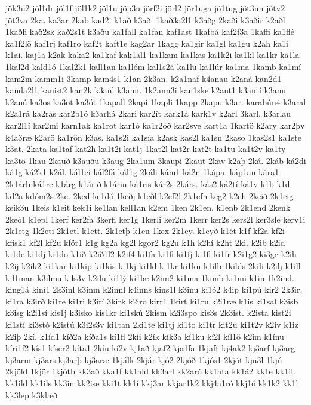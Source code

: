 {jök3u2
jöl1dr
jöl1f
jöl1k2
jöl1u
jöp3u
jörf2i
jörl2
jör1uga
jö1tug
jöt3un
jötv2
jöt3va
2ka.
ka3ar
2kab
kad2i
k1að
k3að.
1kað3a2l1
k3aðg
2kaði
k3aðir
k2aðl
1kaðli
kað2sk
kað2s1t
k3aðu
ka1fall
ka1fan
kaf1ast
1kafbá
kaf2f3a
1kaffi
ka1flé
ka1f2lö
kaf1rj
kaf1ro
kaf2t
kaft1e
kag2ar
1kagg
ka1gir
ka1gl
ka1gu
k2ah
ka1i
k1ai.
kaj1a
k2ak
kaka2
ka1kaf
kak1al1
ka1kam
ka1kas
ka1k2i
ka1kl
ka1kr
ka1la
1kal2d
kald1ó
1kal2k1
kall1an
ka1lóm
kal1s2á
ka1lu
ka1lúr
ka1ma
1kamb
ka1mí
kam2m
kamm1i
3kamp
kam4s1
k1an
2k3an.
k2a1naf
k4anau
k2aná
kan2d1
kanda2l1
kanist2
kan2k
k3anl
k3ann.
1k2ann3i
kan1ske
k2ant1
k3antí
k3anu
k2anú
ka3os
ka3ot
ka3ót
1kapall
2kapi
1kapli
1kapp
2kapu
k3ar.
karabún4
k3aral
k2a1rá
ka2rás
kar2b1ó
k3arhá
2kari
kar2ít
kark1a
kark1v
k2arl
3karl.
k3arlau
kar2l1í
kar2mi
karn1ak
ka1rot
kar1ó
ka1r2óð
kar2sve
kart1a
1kartö
k2ary
kar2þv
k4a3ræ
k2arö
ka1rön
k3as.
ka1s2i
ka1sía
k2ask
kas2l
ka1sn
2kaso
1kas2s1
ka1ste
k3at.
2kata
ka1taf
kat2h
ka1t2i
kat1j
1kat2l
kat2r
kat2t
ka1tu
ka1t2v
ka1ty
ka3tö
1kau
2kauð
k3auðu
k3aug
2ka1um
3kaupi
2kaut
2kav
k2aþ
2ká.
2káb
ká2di
ká1g
ká2k1
k2ál.
kál1ei
kál2fá
kál1g
2káli
kám1
ká2n
1kápa.
káp1an
kára1
2k1árb
ká1re
k1árg
k1árið
k1árin
ká1ris
kár2s
2kárs.
kás2
ká2tí
ká1v
k1b
k1d
kd2a
kdóm2s
2ke.
2ked
ke1dó
1keðj
k1eðl
k2ef2l
2k1efn
keg2
k2eh
2keið
2k1eig
keik3u
1keis
k1eit
kek1i
ke1lan
kell1an
k2em
1ken
2k1en.
k1enb
2k1end
2kenk
2keó1
k1epl
1kerf
ker2fa
3kerfi
ker1g
1kerli
ker2m
1kerr
ker2s
kers2l
ker3sle
kerv1i
2k1etg
1k2eti
2k1etl
k1ett.
2k1etþ
k1eu
1kex
2k1ey.
k1eyð
k1ét
k1f
kf2a
kf2i
kfisk1
kf2l
kf2u
kför1
k1g
kg2a
kg2l
kgor2
kg2u
k1h
k2hí
k2ht
2ki.
k2ib
k2id
ki1de
ki1dj
ki1do
k1ið
k2ið1l2
k2if4
ki1fa
ki1fi
ki1fj
ki1fl
ki1fr
k2i1g2
ki3ge
k2ih
k2ij
k2ik2
ki1kar
ki1kip
ki1kis
ki1kj
ki1kl
ki1kr
ki1ku
k1ilb
1kilds
2kili
k2ilj
k1ill
kil1man
k3ilmu
kils3v
k2ilu
ki1lý
ki1læ
k2im2
ki1ma
1kimb
ki1mi
k1in
1k2ind.
king1á
kiní1
2k3inl
k3inm
k2innl
k4inns
kins1l
k3inu
ki1ó2
k4ip
ki1pú
kir2
2k3ir.
ki1ra
k3irð
ki1re
ki1ri
k3irí
3kirk
k2iro
kirr1
1kirt
ki1ru
k2i1ræ
k1is
ki1sal
k3isb
k3isg
k2i1sí
kis1j
k3isko
kis1kr
ki1skú
2kism
k2i3spo
kis3s
2k3ist.
k2ista
kist2i
ki1stí
ki3stó
k2istú
k3i2s3v
ki1tan
2ki1te
ki1tj
ki1to
ki1tr
kit2u
ki1t2v
k2iv
k1iz
k2iþ
2kí.
k1íd1
kíð2a
kíða1s
kí1fl
2kíi
k2ík
kík3a
kí1ku
kí2l
kíl1ö
k2ím
k1ínu
kíri1f2
kís1
kíser2
kíta1
2kíu
kí2v
kj1að
kjaf2
kja1fa
1kjaft
kj4ak2
kj3arf
kj3arg
kj3arm
kj3ars
kj3arþ
kj3aræ
1kjálk
2kjár
kjó2
2kjóð
1kjós1
2kjót
kju3l
1kjú
2kjöld
1kjör
1kjötb
kk3að
kka1f
kk1ald
kk3arl
kk2aró
kk1ata
kk1á2
kk1e
kk1il.
kk1ild
kk1ils
kk3in
kk2ise
kki1t
kk1í
kkj3ar
kkjar1k2
kkj4a1ró
kkj1ó
kk1k2
kk1l
kk3lep
k3klæð
}
